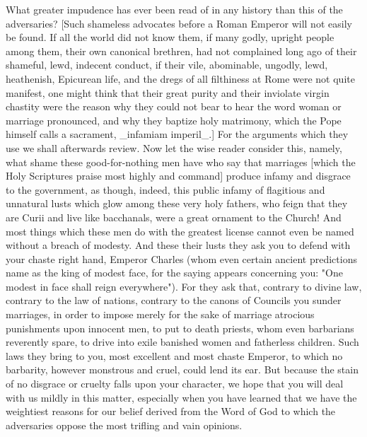 What greater impudence has ever been read of in any history than this
of the adversaries?  [Such shameless advocates before a Roman Emperor
will not easily be found.  If all the world did not know them, if
many godly, upright people among them, their own canonical brethren,
had not complained long ago of their shameful, lewd, indecent conduct,
if their vile, abominable, ungodly, lewd, heathenish, Epicurean life,
and the dregs of all filthiness at Rome were not quite manifest, one
might think that their great purity and their inviolate virgin
chastity were the reason why they could not bear to hear the word
woman or marriage pronounced, and why they baptize holy matrimony,
which the Pope himself calls a sacrament, _infamiam imperil_.] For
the arguments which they use we shall afterwards review.  Now let the
wise reader consider this, namely, what shame these good-for-nothing
men have who say that marriages [which the Holy Scriptures praise
most highly and command] produce infamy and disgrace to the
government, as though, indeed, this public infamy of flagitious and
unnatural lusts which glow among these very holy fathers, who feign
that they are Curii and live like bacchanals, were a great ornament
to the Church!  And most things which these men do with the greatest
license cannot even be named without a breach of modesty.  And these
their lusts they ask you to defend with your chaste right hand,
Emperor Charles (whom even certain ancient predictions name as the
king of modest face, for the saying appears concerning you: "One
modest in face shall reign everywhere").  For they ask that, contrary
to divine law, contrary to the law of nations, contrary to the canons
of Councils you sunder marriages, in order to impose merely for the
sake of marriage atrocious punishments upon innocent men, to put to
death priests, whom even barbarians reverently spare, to drive into
exile banished women and fatherless children.  Such laws they bring
to you, most excellent and most chaste Emperor, to which no barbarity,
however monstrous and cruel, could lend its ear.  But because the
stain of no disgrace or cruelty falls upon your character, we hope
that you will deal with us mildly in this matter, especially when you
have learned that we have the weightiest reasons for our belief
derived from the Word of God to which the adversaries oppose the most
trifling and vain opinions.

